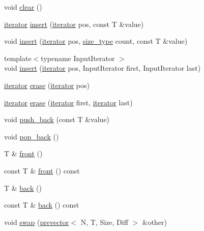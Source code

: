 \begin{DoxyCompactItemize}
\item 
void \mbox{\hyperlink{classprevector_a412f07b8bf5485dabe2fe9d6d5dfe763}{clear}} ()
\item 
\mbox{\hyperlink{classprevector_1_1iterator}{iterator}} \mbox{\hyperlink{classprevector_ad4f368a9aa3f0f650e1b2a0894dafe51}{insert}} (\mbox{\hyperlink{classprevector_1_1iterator}{iterator}} pos, const T \&value)
\item 
void \mbox{\hyperlink{classprevector_aede9f795653c38dc88bb5fabd80f7b6f}{insert}} (\mbox{\hyperlink{classprevector_1_1iterator}{iterator}} pos, \mbox{\hyperlink{classprevector_a7e0da95e6d1c878f6eeb572f4fc12524}{size\+\_\+type}} count, const T \&value)
\item 
{\footnotesize template$<$typename Input\+Iterator $>$ }\\void \mbox{\hyperlink{classprevector_aa14cdf5ea4f9f9b5256bca10e49e682c}{insert}} (\mbox{\hyperlink{classprevector_1_1iterator}{iterator}} pos, Input\+Iterator first, Input\+Iterator last)
\item 
\mbox{\hyperlink{classprevector_1_1iterator}{iterator}} \mbox{\hyperlink{classprevector_a780af143deebcaaecb164fa1a2d98156}{erase}} (\mbox{\hyperlink{classprevector_1_1iterator}{iterator}} pos)
\item 
\mbox{\hyperlink{classprevector_1_1iterator}{iterator}} \mbox{\hyperlink{classprevector_a1bcffc1a855e24c2ac67b11f55d80d5f}{erase}} (\mbox{\hyperlink{classprevector_1_1iterator}{iterator}} first, \mbox{\hyperlink{classprevector_1_1iterator}{iterator}} last)
\item 
void \mbox{\hyperlink{classprevector_af34b1eea43f461465aa29fe7ca67449d}{push\+\_\+back}} (const T \&value)
\item 
void \mbox{\hyperlink{classprevector_a14e92ae67d4f110c66fe8c430f44a027}{pop\+\_\+back}} ()
\item 
T \& \mbox{\hyperlink{classprevector_acb71926f63896b2bd6f4da4ffe515d19}{front}} ()
\item 
const T \& \mbox{\hyperlink{classprevector_a6c970d084ff59fcfb81185456acb4bb6}{front}} () const
\item 
T \& \mbox{\hyperlink{classprevector_a9ff352b7b4f87eb70f0e79547d6f5314}{back}} ()
\item 
const T \& \mbox{\hyperlink{classprevector_a5ae4f96ce4f204e135ffd88f2028c128}{back}} () const
\item 
void \mbox{\hyperlink{classprevector_a30e25ab1782f4a6258688334e5d1b817}{swap}} (\mbox{\hyperlink{classprevector}{prevector}}$<$ N, T, Size, Diff $>$ \&other)

\end{DoxyCompactItemize}
